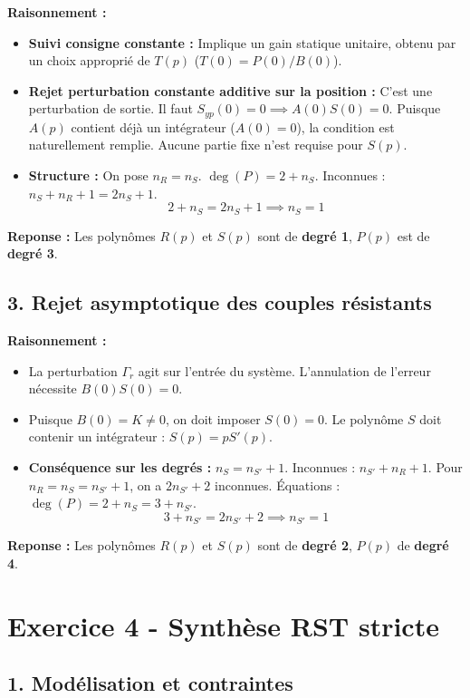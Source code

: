 \documentclass[11pt,a4paper]{article}
\begin{document}
\textbf{Raisonnement :}
\begin{itemize}
    \item \textbf{Suivi consigne constante :} Implique un gain statique unitaire, obtenu par un choix approprié de $T(p)$ ($T(0) = P(0)/B(0)$).
    \item \textbf{Rejet perturbation constante additive sur la position :} C'est une perturbation de sortie. Il faut $S_{yp}(0) = 0 \implies A(0)S(0) = 0$. Puisque $A(p)$ contient déjà un intégrateur ($A(0)=0$), la condition est naturellement remplie. Aucune partie fixe n'est requise pour $S(p)$.
    \item \textbf{Structure :} On pose $n_R = n_S$. $\deg(P) = 2 + n_S$. Inconnues : $n_S + n_R + 1 = 2n_S + 1$.
    $$ 2 + n_S = 2n_S + 1 \implies n_S = 1 $$
\end{itemize}

\textbf{Reponse :} Les polynômes $R(p)$ et $S(p)$ sont de \textbf{degré 1}, $P(p)$ est de \textbf{degré 3}.

\subsection*{3. Rejet asymptotique des couples résistants}

\textbf{Raisonnement :}
\begin{itemize}
    \item La perturbation $\Gamma_r$ agit sur l'entrée du système. L'annulation de l'erreur nécessite $B(0)S(0) = 0$.
    \item Puisque $B(0) = K \neq 0$, on doit imposer $S(0)=0$. Le polynôme $S$ doit contenir un intégrateur : $S(p) = p S'(p)$.
    \item \textbf{Conséquence sur les degrés :} $n_S = n_{S'} + 1$. Inconnues : $n_{S'} + n_R + 1$.
    Pour $n_R = n_S = n_{S'} + 1$, on a $2n_{S'} + 2$ inconnues.
    Équations : $\deg(P) = 2 + n_S = 3 + n_{S'}$.
    $$ 3 + n_{S'} = 2n_{S'} + 2 \implies n_{S'} = 1 $$
\end{itemize}

\textbf{Reponse :} Les polynômes $R(p)$ et $S(p)$ sont de \textbf{degré 2}, $P(p)$ de \textbf{degré 4}.

\hrulefill

\section*{Exercice 4 - Synthèse RST stricte}

\subsection*{1. Modélisation et contraintes}
\end{document}
